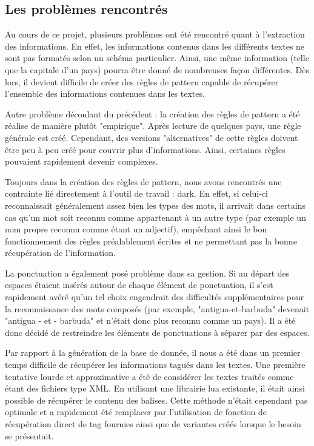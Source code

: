 \documentclass[11pt,a4paper]{article}
\begin{document}
\subsection{Les problèmes rencontrés}
Au cours de ce projet, plusieurs problèmes ont été rencontré quant à l'extraction des informations.
En effet, les informations contenus dans les différents textes ne sont pas formatés selon un schéma particulier.
Ainsi, une même information (telle que la capitale d'un pays) pourra être donné de nombreuses façon différentes.
Dès lors, il devient difficile de créer des règles de pattern capable de récupérer l'ensemble des informations contenues dans les textes.

Autre problème découlant du précédent : la création des règles de pattern a été réalise de manière plutôt "empirique".
Après lecture de quelques pays, une règle générale est créé.
Cependant, des versions "alternatives" de cette règles doivent être peu à peu créé pour couvrir plus d'informations.
Ainsi, certaines règles pouvaient rapidement devenir complexes.

Toujours dans la création des règles de pattern, nous avons rencontrés une contrainte lié directement à l'outil de travail : dark.
En effet, si celui-ci reconnaissait généralement assez bien les types des mots, il arrivait dans certains cas qu'un mot soit reconnu comme appartenant à un autre type (par exemple un nom propre reconnu comme étant un adjectif), empêchant ainsi le bon fonctionnement des règles préalablement écrites et ne permettant pas la bonne récupération de l'information.

La ponctuation a également posé problème dans sa gestion.
Si au départ des espaces étaient insérés autour de chaque élément de ponctuation, il s'est rapidement avéré qu'un tel choix engendrait des difficultés supplémentaires pour la reconnaissance des mots composés (par exemple, "antigua-et-barbuda" devenait "antigua - et - barbuda" et n'était donc plus reconnu comme un pays).
Il a été donc décidé de restreindre les éléments de ponctuations à séparer par des espaces.

Par rapport à la génération de la base de donnée, il nous a été dans un premier temps difficile de récupérer les informations tagués dans les textes.
Une première tentative lourde et approximative a été de considérer les textes traités comme étant des fichiers type XML.
En utilisant une librairie lua existante, il était ainsi possible de récupérer le contenu des balises.
Cette méthode n'était cependant pas optimale et a rapidement été remplacer par l'utilisation de fonction de récupération direct de tag fournies ainsi que de variantes créés lorsque le besoin se présentait.
\end{document}
